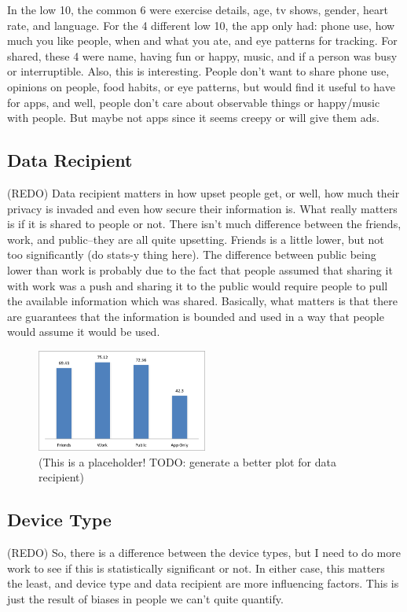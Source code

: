 \documentclass{acm_proc_article-sp}
\begin{document}
In the low 10, the common 6 were exercise details, age, tv shows, gender, heart rate, and language. For the 4 different low 10, the app only had: phone use, how much you like people, when and what you ate, and eye patterns for tracking. For shared, these 4 were name, having fun or happy, music, and if a person was busy or interruptible. Also, this is interesting. People don't want to share phone use, opinions on people, food habits, or eye patterns, but would find it useful to have for apps, and well, people don't care about observable things or happy/music with people. But maybe not apps since it seems creepy or will give them ads.

\subsection{Data Recipient}
(REDO) Data recipient matters in how upset people get, or well, how much their privacy is invaded and even how secure their information is. What really matters is if it is shared to people or not. There isn't much difference between the friends, work, and public--they are all quite upsetting. Friends is a little lower, but not too significantly (do stats-y thing here). The difference between public being lower than work is probably due to the fact that people assumed that sharing it with work was a push and sharing it to the public would require people to pull the available information which was shared. Basically, what matters is that there are guarantees that the information is bounded and used in a way that people would assume it would be used.

\begin{figure}
	\centering
	\includegraphics[width=0.5\textwidth]{recipient.png}
	\caption{(This is a placeholder! TODO: generate a better plot for data recipient)}
\end{figure}

\subsection{Device Type}
(REDO) So, there is a difference between the device types, but I need to do more work to see if this is statistically significant or not. In either case, this matters the least, and device type and data recipient are more influencing factors. This is just the result of biases in people we can't quite quantify.  
\end{document}
